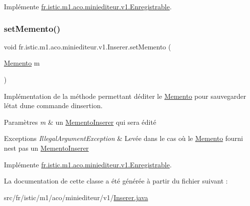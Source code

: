Implémente \hyperlink{interfacefr_1_1istic_1_1m1_1_1aco_1_1miniediteur_1_1v1_1_1Enregistrable_aadf173c765d103d3924bbb688c45abb6}{fr.\+istic.\+m1.\+aco.\+miniediteur.\+v1.\+Enregistrable}.

\mbox{\label{classfr_1_1istic_1_1m1_1_1aco_1_1miniediteur_1_1v1_1_1Inserer_a1978002e0aa031a5293ff3263c49fe94}} 
\subsubsection{\texorpdfstring{set\+Memento()}{setMemento()}}
{\footnotesize\ttfamily void fr.\+istic.\+m1.\+aco.\+miniediteur.\+v1.\+Inserer.\+set\+Memento (\begin{DoxyParamCaption}\item[{\hyperlink{interfacefr_1_1istic_1_1m1_1_1aco_1_1miniediteur_1_1v1_1_1Memento}{Memento}}]{m }\end{DoxyParamCaption})}



Implémentation de la méthode permettant d\textquotesingle{}éditer le \hyperlink{interfacefr_1_1istic_1_1m1_1_1aco_1_1miniediteur_1_1v1_1_1Memento}{Memento} pour sauvegarder l\textquotesingle{}état d\textquotesingle{}une commande d\textquotesingle{}insertion. 


\begin{DoxyParams}{Paramètres}
{\em m} & un \hyperlink{classfr_1_1istic_1_1m1_1_1aco_1_1miniediteur_1_1v1_1_1MementoInserer}{Memento\+Inserer} qui sera édité \\
\hline
\end{DoxyParams}

\begin{DoxyExceptions}{Exceptions}
{\em Illegal\+Argument\+Exception} & Levée dans le cas où le \hyperlink{interfacefr_1_1istic_1_1m1_1_1aco_1_1miniediteur_1_1v1_1_1Memento}{Memento} fourni n\textquotesingle{}est pas un \hyperlink{classfr_1_1istic_1_1m1_1_1aco_1_1miniediteur_1_1v1_1_1MementoInserer}{Memento\+Inserer} \\
\hline
\end{DoxyExceptions}


Implémente \hyperlink{interfacefr_1_1istic_1_1m1_1_1aco_1_1miniediteur_1_1v1_1_1Enregistrable_a949bb6784743800c2d743def265f41b1}{fr.\+istic.\+m1.\+aco.\+miniediteur.\+v1.\+Enregistrable}.



La documentation de cette classe a été générée à partir du fichier suivant \+:\begin{DoxyCompactItemize}
\item 
src/fr/istic/m1/aco/miniediteur/v1/\hyperlink{Inserer_8java}{Inserer.\+java}\end{DoxyCompactItemize}
